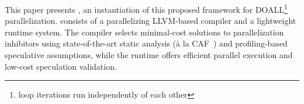 
%
%
%

%
%

This paper presents \name, an instantiation of this proposed framework
for DOALL\footnote{loop iterations run independently of each other}
parallelization. \name consists of a parallelizing LLVM-based compiler
and a lightweight
runtime system. The compiler selects minimal-cost solutions to
parallelization inhibitors using state-of-the-art static analysis
(\`{a} la CAF~\cite{johnson:cgo:17}) and profiling-based speculative
assumptions, while the runtime offers efficient parallel execution and
low-cost speculation validation.
%

